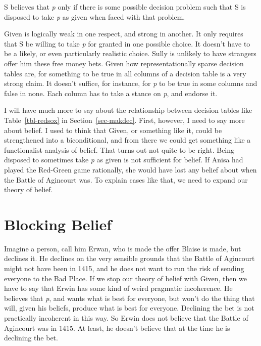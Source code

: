 \documentclass[
  10pt,
  letterpaper,
  twoside]{scrbook}
\providecommand{\tightlist}{%
  \setlength{\itemsep}{0pt}\setlength{\parskip}{0pt}}\usepackage{longtable,booktabs,array}
\begin{document}
\begin{description}
\tightlist
\item[Given]
S believes that \emph{p} only if there is some possible decision problem
such that S is disposed to take \emph{p} as given when faced with that
problem.
\end{description}

Given is logically weak in one respect, and strong in another. It only
requires that S be willing to take \emph{p} for granted in one possible
choice. It doesn't have to be a likely, or even particularly realistic
choice. Sully is unlikely to have strangers offer him these free money
bets. Given how representationally sparse decision tables are, for
something to be true in all columns of a decision table is a very strong
claim. It doesn't suffice, for instance, for \emph{p} to be true in some
columns and false in none. Each column has to take a stance on \emph{p},
and endorse it.

I will have much more to say about the relationship between decision
tables like Table~\ref{tbl-redsox} in Section~\ref{sec-makdec}. First,
however, I need to say more about belief. I used to think that Given, or
something like it, could be strengthened into a biconditional, and from
there we could get something like a functionalist analysis of belief.
That turns out not quite to be right. Being disposed to sometimes take
\emph{p} as given is not sufficient for belief. If Anisa had played the
Red-Green game rationally, she would have lost any belief about when the
Battle of Agincourt was. To explain cases like that, we need to expand
our theory of belief.

\section{Blocking Belief}\label{sec-block}

Imagine a person, call him Erwan, who is made the offer Blaise is made,
but declines it. He declines on the very sensible grounds that the
Battle of Agincourt might not have been in 1415, and he does not want to
run the risk of sending everyone to the Bad Place. If we stop our theory
of belief with Given, then we have to say that Erwin has some kind of
weird pragmatic incoherence. He believes that \emph{p}, and wants what
is best for everyone, but won't do the thing that will, given his
beliefs, produce what is best for everyone. Declining the bet is not
practically incoherent in this way. So Erwin does not believe that the
Battle of Agincourt was in 1415. At least, he doesn't believe that at
the time he is declining the bet.
\end{document}

